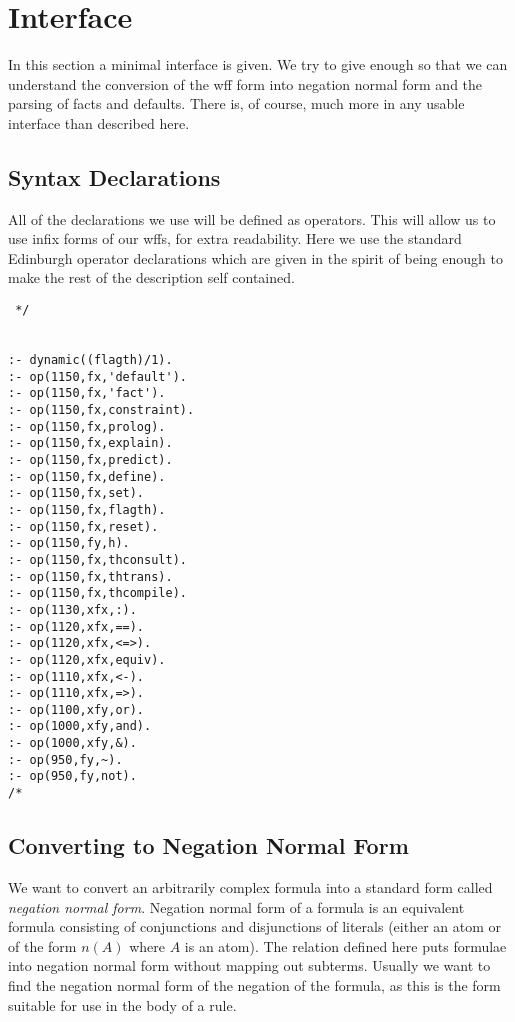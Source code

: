 \section{Interface}
In this section a minimal interface is given. We try to give
enough so that we can understand the conversion of the wff form
into negation normal form and
the parsing of facts and defaults. There is, of course,
much more in any usable interface than described here.
\subsection{Syntax Declarations}
All of the declarations we use will be defined as operators.
This will allow us to use infix forms of our wffs, for extra readability.
Here we use the standard Edinburgh operator declarations which are
given in the spirit of being enough to make the rest of the description
self contained.
\begin{verbatim} */

     
:- dynamic((flagth)/1).
:- op(1150,fx,'default').
:- op(1150,fx,'fact').
:- op(1150,fx,constraint).
:- op(1150,fx,prolog).
:- op(1150,fx,explain).
:- op(1150,fx,predict).
:- op(1150,fx,define).
:- op(1150,fx,set).
:- op(1150,fx,flagth).
:- op(1150,fx,reset).
:- op(1150,fy,h).
:- op(1150,fx,thconsult).
:- op(1150,fx,thtrans).
:- op(1150,fx,thcompile).
:- op(1130,xfx,:).
:- op(1120,xfx,==).
:- op(1120,xfx,<=>).
:- op(1120,xfx,equiv).
:- op(1110,xfx,<-).
:- op(1110,xfx,=>).
:- op(1100,xfy,or).
:- op(1000,xfy,and).
:- op(1000,xfy,&).
:- op(950,fy,~).
:- op(950,fy,not).
/* \end{verbatim}


\subsection{Converting to Negation Normal Form} \label{nnf}
We want to convert an arbitrarily complex formula into a standard form
called {\em negation normal form\/}. Negation normal form of a formula is
an equivalent formula consisting of conjunctions and disjunctions of
literals (either an atom or of the form $n(A)$ where $A$ is an atom).
The relation defined here puts formulae into negation normal form
without mapping out subterms.
Usually we want to find the negation normal form of the negation of the
formula, as this is the form suitable for use in the body of a rule.

